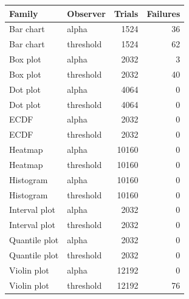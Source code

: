 \begin{longtable}{llrr}\toprule
Family & Observer & Trials & Failures\\\midrule\endhead
Bar chart & alpha & 1524 & 36\\
Bar chart & threshold & 1524 & 62\\
Box plot & alpha & 2032 & 3\\
Box plot & threshold & 2032 & 40\\
Dot plot & alpha & 4064 & 0\\
Dot plot & threshold & 4064 & 0\\
ECDF & alpha & 2032 & 0\\
ECDF & threshold & 2032 & 0\\
Heatmap & alpha & 10160 & 0\\
Heatmap & threshold & 10160 & 0\\
Histogram & alpha & 10160 & 0\\
Histogram & threshold & 10160 & 0\\
Interval plot & alpha & 2032 & 0\\
Interval plot & threshold & 2032 & 0\\
Quantile plot & alpha & 2032 & 0\\
Quantile plot & threshold & 2032 & 0\\
Violin plot & alpha & 12192 & 0\\
Violin plot & threshold & 12192 & 76\\
\bottomrule\end{longtable}
